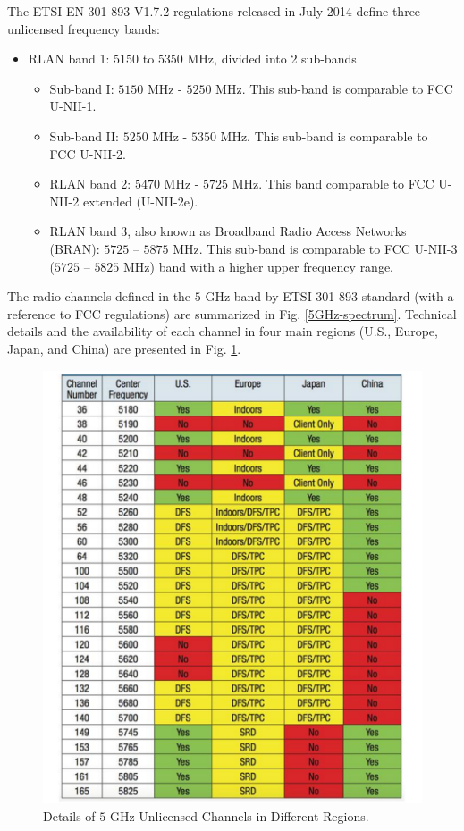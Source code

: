 The ETSI EN 301 893 V1.7.2 regulations \cite{LBT-ETSI-2014} released in July 2014 define three unlicensed frequency bands:
\begin{itemize}
\item
	RLAN band 1: $5150$ to $5350$ MHz, divided into 2 sub-bands
	\begin{itemize}
	\item
		Sub-band I: $5150$ MHz - $5250$ MHz. This sub-band is comparable to FCC U-NII-1. 
	\item
		Sub-band II: $5250$ MHz - $5350$ MHz. This sub-band is comparable to FCC U-NII-2.
	\item
		RLAN band 2: $5470$ MHz - $5725$ MHz. This band comparable to FCC U-NII-2 extended (U-NII-2e).
	\item
		RLAN band 3, also known as Broadband Radio Access Networks (BRAN): $5725$ – $5875$ MHz. This sub-band is comparable to FCC U-NII-3 ($5725$ – $5825$ MHz) band with a higher upper frequency range.
	\end{itemize}
\end{itemize}

The radio channels defined in the $5$ GHz band by ETSI 301 893 standard (with a reference to FCC regulations) are summarized in Fig. \ref{5GHz-spectrum}.  Technical details and the availability of each channel in four main regions (U.S., Europe, Japan, and China) are presented in Fig. \ref{figs:5GHz-spectrum-table}.
\begin{figure}[!ht]
	\centering
	\includegraphics[width=0.9\columnwidth]{figs/5GHz-spectrum-table}
	\caption{Details of $5$ GHz Unlicensed Channels in Different Regions.}
	\label{figs:5GHz-spectrum-table}
\end{figure}


